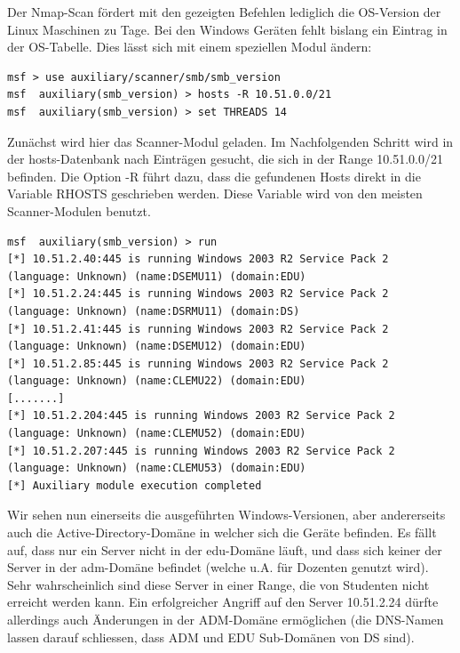 \documentclass[11pt,a4paper]{scrartcl}
\begin{document}
Der Nmap-Scan fördert mit den gezeigten Befehlen lediglich die OS-Version der Linux Maschinen zu Tage. Bei den Windows Geräten fehlt bislang ein Eintrag in der OS-Tabelle. Dies lässt sich mit einem speziellen Modul ändern:
\begin{lstlisting}
msf > use auxiliary/scanner/smb/smb_version 
msf  auxiliary(smb_version) > hosts -R 10.51.0.0/21
msf  auxiliary(smb_version) > set THREADS 14
\end{lstlisting}
Zunächst wird hier das Scanner-Modul geladen. Im Nachfolgenden Schritt wird in der hosts-Datenbank nach Einträgen gesucht, die sich in der Range 10.51.0.0/21 befinden. Die Option -R führt dazu, dass die gefundenen Hosts direkt in die Variable RHOSTS geschrieben werden. Diese Variable wird von den meisten Scanner-Modulen benutzt.
\begin{lstlisting}
msf  auxiliary(smb_version) > run 
[*] 10.51.2.40:445 is running Windows 2003 R2 Service Pack 2 (language: Unknown) (name:DSEMU11) (domain:EDU)
[*] 10.51.2.24:445 is running Windows 2003 R2 Service Pack 2 (language: Unknown) (name:DSRMU11) (domain:DS)
[*] 10.51.2.41:445 is running Windows 2003 R2 Service Pack 2 (language: Unknown) (name:DSEMU12) (domain:EDU)
[*] 10.51.2.85:445 is running Windows 2003 R2 Service Pack 2 (language: Unknown) (name:CLEMU22) (domain:EDU)
[.......]
[*] 10.51.2.204:445 is running Windows 2003 R2 Service Pack 2 (language: Unknown) (name:CLEMU52) (domain:EDU)
[*] 10.51.2.207:445 is running Windows 2003 R2 Service Pack 2 (language: Unknown) (name:CLEMU53) (domain:EDU)
[*] Auxiliary module execution completed
\end{lstlisting}
Wir sehen nun einerseits die ausgeführten Windows-Versionen, aber andererseits auch die Active-Directory-Domäne in welcher sich die Geräte befinden. Es fällt auf, dass nur ein Server nicht in der edu-Domäne läuft, und dass sich keiner der Server in der adm-Domäne befindet (welche u.A. für Dozenten genutzt wird). Sehr wahrscheinlich sind diese Server in einer Range, die von Studenten nicht erreicht werden kann. Ein erfolgreicher Angriff auf den Server 10.51.2.24 dürfte allerdings auch Änderungen in der ADM-Domäne ermöglichen (die DNS-Namen lassen darauf schliessen, dass ADM und EDU Sub-Domänen von DS sind).
\end{document}
